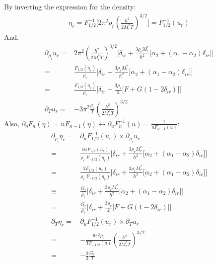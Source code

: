 \documentclass[preprint,prc,preprintnumbers,superscriptaddress,amsmath,amssymb,floatfix]{revtex4-1}
\begin{document}
By inverting the expression for the density:
\begin{equation}
 \begin{split}
  \eta_r= F^{-1}_{1/2}\big[2 \pi^2 \rho_r(\frac{\hbar^2}{2 M_r^{*}T})^{3/2}\big]=F^{-1}_{1/2}(u_r)
 \end{split}
\end{equation}
And,
\begin{equation}
 \begin{split}
  \partial_{\rho_i}u_r=&2\pi^2(\frac{\hbar^2}{2 M_r^{*}T})^{3/2}\Big[\delta_{ir}+\frac{3 \rho_r M_r^{*}}{\hbar^2}\big[\alpha_2+(\alpha_1-\alpha_2)\delta_{ir}\big]\Big]\\
  =&\frac{F_{1/2}(\eta_r)}{\rho_r}\Big[\delta_{ir}+\frac{3 \rho_r M_r^{*}}{\hbar^2}\big[\alpha_2+(\alpha_1-\alpha_2)\delta_{ir}\big]\Big]\\
  =&\frac{F_{1/2}(\eta_r)}{\rho_r}\Big[\delta_{ir}+\frac{3 \rho_r}{2}\big[F+G(1-2\delta_{ir})\big]\Big]\\
  \partial_{T}u_r=&-3 \pi^2 \frac{\rho_r}{T}(\frac{\hbar^2}{2M_r^{*}T})^{3/2}
 \end{split}
\end{equation}
Also, $\partial_{\eta}F_n(\eta)=nF_{n-1}(\eta) \leftrightarrow \partial_{u}F^{-1}_n(u)=\frac{1}{nF_{n-1}(u)}$:
\begin{equation}
 \begin{split}
  \partial_{\rho_i}\eta_r=&\partial_{u}F^{-1}_{1/2}(u_r) \times \partial_{\rho_i}u_r\\
  =&\frac{\partial{u}F_{1/2}(u_r)}{\rho_r \ F_{-1/2}(\eta_r)} \Big[\delta_{ir}+\frac{3 \rho_r M_r^{*}}{\hbar^2}\big[\alpha_2+(\alpha_1-\alpha_2)\delta_{ir}\big]\Big]\\
  =&\frac{2F_{1/2}(u_r)}{\rho_r \ F_{-1/2}(\eta_r)} \Big[\delta_{ir}+\frac{3 \rho_r M_r^{*}}{\hbar^2}\big[\alpha_2+(\alpha_1-\alpha_2)\delta_{ir}\big]\Big]\\
  \equiv& \frac{G_r}{\rho_r}\Big[\delta_{ir}+\frac{3 \rho_r M_r^{*}}{\hbar^2}\big[\alpha_2+(\alpha_1-\alpha_2)\delta_{ir}\big]\Big]\\
  =& \frac{G_r}{\rho_r}\Big[\delta_{ir}+\frac{3 \rho_r}{2}\big[F+G(1-2\delta_{ir})\big]\Big]\\
  \partial_{T}\eta_r=&\partial_{u}F^{-1}_{1/2}(u_r) \times \partial_{T}u_r\\
  =&-\frac{6 \pi^2\rho_r}{T F_{-1/2}(u)}(\frac{\hbar^2}{2M_r^{*}T})^{3/2}\\
  =&-\frac{3}{2} \frac{G_r}{T}
 \end{split}
\end{equation}
\end{document}
